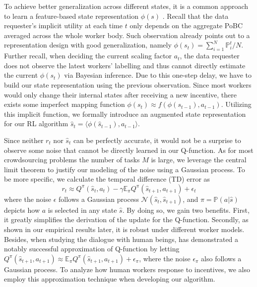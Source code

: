 \vspace{-2mm}
To achieve better generalization across different states, it is a common approach to learn a feature-based state representation $\phi(s)$ \citep{Mnih15, Liang16}. Recall that the data requester's implicit utility at each time $t$ only depends on the aggregate PoBC averaged across the whole worker body. Such observation already points out to a  representation design with good generalization, namely 
$\phi(s_t) = {\sum}_{i=1}^N \mathbb{P}^t_i/N$.
Further recall, when deciding the current scaling factor $a_t$, the data requester does not observe the latest workers' labelling and thus cannot directly estimate the current $\phi(s_t)$ via Bayesian inference. Due to this one-step delay, we have to build our state representation using the previous observation. Since most workers would only change their internal states after receiving a new incentive, there exists some imperfect mapping function $\phi(s_{t}) \approx f(\phi(s_{t-1}),a_{t-1})$. %
Utilizing this implicit function, we formally introduce an augmented state representation for our RL algorithm
$\hat{s}_t = \langle \phi(\hat{s}_{t-1}), a_{t-1} \rangle$.


Since neither $r_t$ nor $\hat{s}_t$ can be perfectly accurate, it would not be a surprise to observe some noise that cannot be directly learned in our Q-function. %
As for most crowdsourcing problems the number of tasks $M$ is large, we leverage the central limit theorem to justify our modeling of the noise using a Gaussian process.
To be more specific, we calculate the temporal difference (TD) error as 
\begin{equation}
r_t \approx Q^\pi(\hat{s}_t, a_t) - \gamma \mathbb{E}_{\pi}Q^{\pi}(\hat{s}_{t+1},a_{t+1}) + \epsilon_t 
\end{equation}
where the noise $\epsilon $ follows a Gaussian process $\mathcal{N}(\hat{s}_t,\hat{s}_{t+1})$, and $\pi=\mathbb{P}(a|\hat{s})$ depicts how $a$ is selected in any state $\hat{s}$.
By doing so, we gain two benefits. First, it greatly simplifies the derivation of the update for the Q-function. Secondly, as shown in our empirical results later, it is robust under different worker models.
Besides, when studying the dialogue with human beings, \citet{gasic2014gaussian} has demonstrated a notably successful approximation of Q-function by letting $Q^{\pi}(\hat{s}_{t+1},a_{t+1})\approx\mathbb{E}_{\pi}Q^{\pi}(\hat{s}_{t+1},a_{t+1})+\epsilon_{\pi}$, where the noise $\epsilon_{\pi}$ also follows a Gaussian process.
To analyze how human workers response to incentives, we also employ this approximation technique when developing our algorithm.

